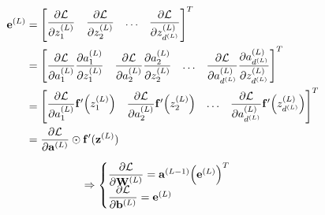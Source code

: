 \documentclass[14pt, a4paper]{article}
\numberwithin{equation}{section}
\numberwithin{algorithm}{section}
\numberwithin{figure}{section}
\begin{document}
\begin{equation}
	\begin{aligned}
		\bold{e}^{(L)}&=\begin{bmatrix} \dfrac{\partial\mathcal{L}}{\partial z_1^{(L)}} & \dfrac{\partial\mathcal{L}}{\partial z_2^{(L)}} & \dots & \dfrac{\partial\mathcal{L}}{\partial z_{d^{(L)}}^{(L)}} \end{bmatrix}^T\\&=\begin{bmatrix} \dfrac{\partial\mathcal{L}}{\partial a_1^{(L)}}\dfrac{\partial a_1^{(L)}}{\partial z_1^{(L)}} & \dfrac{\partial\mathcal{L}}{\partial a_2^{(L)}}\dfrac{\partial a_2^{(L)}}{\partial z_2^{(L)}} & \dots & \dfrac{\partial\mathcal{L}}{\partial a_{d^{(L)}}^{(L)}}\dfrac{\partial a_{d^{(L)}}^{(L)}}{\partial z_{d^{(L)}}^{(L)}} \end{bmatrix}^T\\&=\begin{bmatrix} \dfrac{\partial\mathcal{L}}{\partial a_1^{(L)}}\bold{f}^{\prime}\Big(z_1^{(L)}\Big) & \dfrac{\partial\mathcal{L}}{\partial a_2^{(L)}}\bold{f}^{\prime}\Big(z_2^{(L)}\Big) & \dots & \dfrac{\partial\mathcal{L}}{\partial a_{d^{(L)}}^{(L)}}\bold{f}^{\prime}\Big(z_{d^{(L)}}^{(L)}\Big) \end{bmatrix}^T\\&=\dfrac{\partial \mathcal{L}}{\partial \bold{a}^{(L)}} \odot \bold{f}^{\prime}(\bold{z}^{(L)})
	\end{aligned}
\end{equation}

\begin{equation}
	\Rightarrow \begin{cases}\dfrac{\partial \mathcal{L}}{\partial \bold{W}^{(L)}}=\bold{a}^{(L-1)}\Big(\bold{e}^{(L)}\Big)^T \\ \dfrac{\partial \mathcal{L}}{\partial \bold{b}^{(L)}}=\bold{e}^{(L)} \end{cases}
\end{equation}
\end{document}
